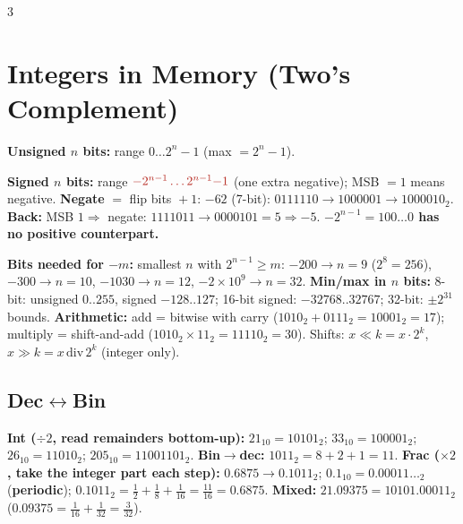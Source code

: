 \documentclass[9pt]{extarticle}
\newcommand{\hl}[1]{\textbf{\textcolor{BrickRed}{#1}}}
\begin{document}
\begin{multicols}{3}
\section{Integers in Memory (Two's Complement)}
\hl{Unsigned $n$ bits:} range $0\ldots2^n{-}1$ (max $=2^n{-}1$).
\begin{kbox}\raggedright
\textbf{Signed $n$ bits:} range $\textcolor{BrickRed}{-2^{n-1}\ldots2^{n-1}{-}1}$ (one extra negative); MSB $=1$ means negative. \textbf{Negate} $=$ flip bits ${}+1$: $-62$ (7-bit): $0111110\to1000001\to1000010_2$. \textbf{Back:} MSB $1\Rightarrow$ negate: $1111011\to0000101{=}5\Rightarrow-5$. \hl{$-2^{n-1}=100\ldots0$ has no positive counterpart.}
\end{kbox}
\hl{Bits needed for $-m$:} smallest $n$ with $2^{n-1}\ge m$: $-200\to n{=}9$ ($2^8{=}256$), $-300\to n{=}10$, $-1030\to n{=}12$, $-2{\times}10^9\to n{=}32$.
\hl{Min/max in $n$ bits:} 8-bit: unsigned $0..255$, signed $-128..127$; 16-bit signed: $-32768..32767$; 32-bit: $\pm2^{31}$ bounds.
\hl{Arithmetic:} add = bitwise with carry ($1010_2+0111_2=10001_2=17$); multiply = shift-and-add ($1010_2{\times}11_2=11110_2=30$). Shifts: $x\ll k=x\cdot2^k$, $x\gg k=x\,\mathrm{div}\,2^k$ (integer only).

\subsection{Dec$\leftrightarrow$Bin}
\textbf{Int ($\div2$, read remainders \hl{bottom-up}):} $21_{10}=10101_2$; $33_{10}=100001_2$; $26_{10}=11010_2$; $205_{10}=11001101_2$. \textbf{Bin$\to$dec:} $1011_2=8+2+1=11$.
\textbf{Frac ($\times2$, take the \hl{integer part} each step):} $0.6875\to0.1011_2$; $0.1_{10}=0.00011\ldots_2$ (\hl{periodic}); $0.1011_2=\frac12+\frac18+\frac1{16}=\frac{11}{16}=0.6875$.
\textbf{Mixed:} $21.09375=10101.00011_2$ ($0.09375=\frac1{16}+\frac1{32}=\frac3{32}$).


\end{multicols}
\end{document}
